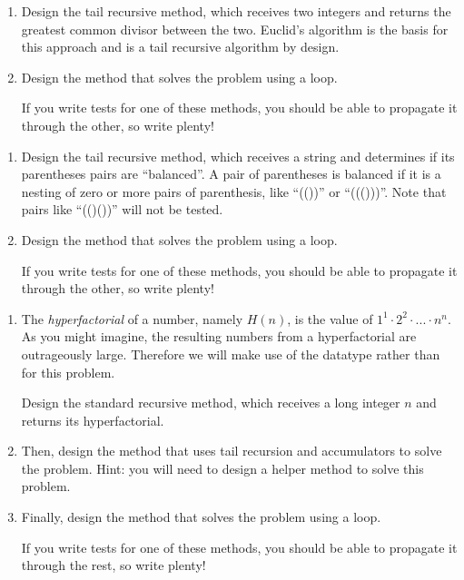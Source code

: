 \begin{enumerate}[label=(\alph*)]
    \item Design the  tail recursive method, which receives two integers and returns the greatest common divisor between the two. Euclid's algorithm is the basis for this approach and is a tail recursive algorithm by design.
    \item Design the  method that solves the problem using a loop.

    If you write tests for one of these methods, you should be able to propagate it through the other, so write plenty!
\end{enumerate}

\begin{enumerate}[label=(\alph*)]
    \item Design the  tail recursive method, which receives a string and determines if its parentheses pairs are ``balanced''. A pair of parentheses is balanced if it is a nesting of zero or more pairs of parenthesis, like ``(())'' or ``((()))''. Note that pairs like ``(()())'' will not be tested.

    \item Design the  method that solves the problem using a loop.

    If you write tests for one of these methods, you should be able to propagate it through the other, so write plenty!
\end{enumerate}


\begin{enumerate}[label=(\alph*)]
    \item The \textit{hyperfactorial} of a number, namely $H(n)$, is the value of $1^1 \cdot 2^2 \cdot ... \cdot n^n$. As you might imagine, the resulting numbers from a hyperfactorial are outrageously large. Therefore we will make use of the  datatype rather than  for this problem. 
    
    Design the standard recursive  method, which receives a long integer $n$ and returns its hyperfactorial.
    \item Then, design the  method that uses tail recursion and accumulators to solve the problem. Hint: you will need to design a  helper method to solve this problem.

    \item Finally, design the  method that solves the problem using a loop.

    If you write tests for one of these methods, you should be able to propagate it through the rest, so write plenty!
\end{enumerate}

